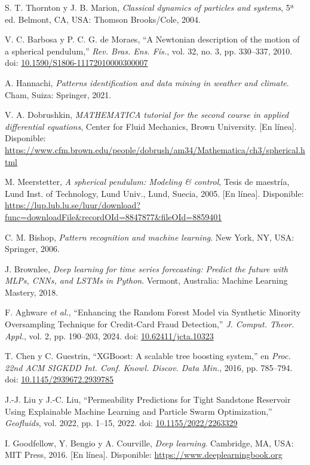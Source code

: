 \endgroup

\noindent [2] S. T. Thornton y J. B. Marion, \textit{Classical dynamics of particles and systems}, 5ª ed. Belmont, CA, USA: Thomson Brooks/Cole, 2004.

\noindent [3] V. C. Barbosa y P. C. G. de Moraes, ``A Newtonian description of the motion of a spherical pendulum,'' \textit{Rev. Bras. Ens. Fís.}, vol. 32, no. 3, pp. 330--337, 2010. doi: \url{10.1590/S1806-11172010000300007}

\noindent [4] A. Hannachi, \textit{Patterns identification and data mining in weather and climate}. Cham, Suiza: Springer, 2021.

\noindent [5] V. A. Dobrushkin, \textit{MATHEMATICA tutorial for the second course in applied differential equations}, Center for Fluid Mechanics, Brown University. [En línea]. Disponible: \url{https://www.cfm.brown.edu/people/dobrush/am34/Mathematica/ch3/spherical.html}

\noindent [6] M. Meerstetter, \textit{A spherical pendulum: Modeling \& control}, Tesis de maestría, Lund Inst. of Technology, Lund Univ., Lund, Suecia, 2005. [En línea]. Disponible: \url{https://lup.lub.lu.se/luur/download?func=downloadFile&recordOId=8847877&fileOId=8859401}

\noindent [7] C. M. Bishop, \textit{Pattern recognition and machine learning}. New York, NY, USA: Springer, 2006.

\noindent [8] J. Brownlee, \textit{Deep learning for time series forecasting: Predict the future with MLPs, CNNs, and LSTMs in Python}. Vermont, Australia: Machine Learning Mastery, 2018.

\noindent [9] F. Aghware \textit{et al.}, ``Enhancing the Random Forest Model via Synthetic Minority Oversampling Technique for Credit-Card Fraud Detection,'' \textit{J. Comput. Theor. Appl.}, vol. 2, pp. 190--203, 2024. doi: \url{10.62411/jcta.10323}

\noindent [10] T. Chen y C. Guestrin, ``XGBoost: A scalable tree boosting system,'' en \textit{Proc. 22nd ACM SIGKDD Int. Conf. Knowl. Discov. Data Min.}, 2016, pp. 785--794. doi: \url{10.1145/2939672.2939785}

\noindent [11] J.-J. Liu y J.-C. Liu, ``Permeability Predictions for Tight Sandstone Reservoir Using Explainable Machine Learning and Particle Swarm Optimization,'' \textit{Geofluids}, vol. 2022, pp. 1--15, 2022. doi: \url{10.1155/2022/2263329}

\noindent [12] I. Goodfellow, Y. Bengio y A. Courville, \textit{Deep learning}. Cambridge, MA, USA: MIT Press, 2016. [En línea]. Disponible: \url{https://www.deeplearningbook.org}

